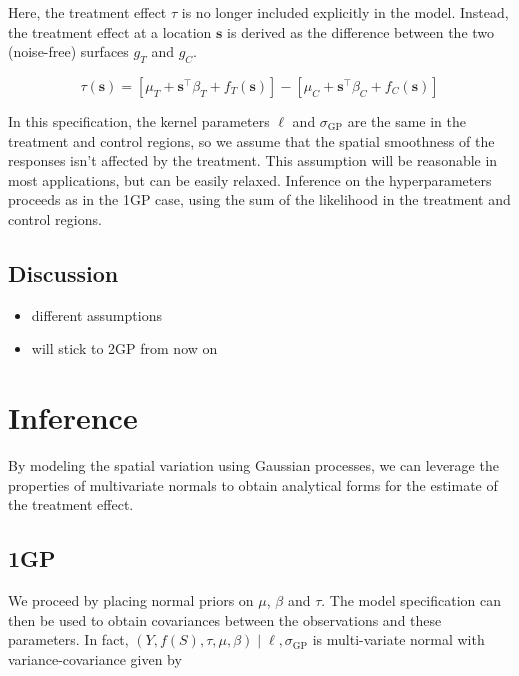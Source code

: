 \documentclass[letter]{article}
\providecommand{\tightlist}{%
      \setlength{\itemsep}{0pt}\setlength{\parskip}{0pt}}
\newcommand{\genericdel}[3]{%
      \left#1#3\right#2
    }
\newcommand{\del}[1]{\genericdel(){#1}}
\newcommand{\sbr}[1]{\genericdel[]{#1}}
\newcommand{\trans}{^{\intercal}}
\newcommand{\sigmaf}{\sigma_{\mathrm{GP}}}
\newcommand{\svec}{\mathbold{s}}
\providecommand{\tightlist}{%
  	  \setlength{\itemsep}{0pt}\setlength{\parskip}{0pt}}
\begin{document}
Here, the treatment effect \(\tau\) is no longer included explicitly in
the model. Instead, the treatment effect at a location \(\svec\) is
derived as the difference between the two (noise-free) surfaces \(g_T\)
and \(g_C\).

\begin{equation}
\tau(\svec) = \sbr{\mu_T + \svec\trans\beta_T + f_T(\svec)} - \sbr{\mu_C + \svec\trans\beta_C + f_C(\svec)}
\end{equation}

In this specification, the kernel parameters \(\ell\) and \(\sigmaf\)
are the same in the treatment and control regions, so we assume that the
spatial smoothness of the responses isn't affected by the treatment.
This assumption will be reasonable in most applications, but can be
easily relaxed. Inference on the hyperparameters proceeds as in the 1GP
case, using the sum of the likelihood in the treatment and control
regions.
    


    	\subsection{Discussion}\label{discussion}

\begin{itemize}
\tightlist
\item
  different assumptions
\item
  will stick to 2GP from now on
\end{itemize}
    


    	\section{Inference}\label{inference}

By modeling the spatial variation using Gaussian processes, we can
leverage the properties of multivariate normals to obtain analytical
forms for the estimate of the treatment effect.
    


    	\subsection{1GP}\label{gp}

We proceed by placing normal priors on \(\mu\), \(\beta\) and \(\tau\).
The model specification can then be used to obtain covariances between
the observations and these parameters. In fact,
\(\del{Y,f(S),\tau,\mu,\beta} \mid \ell,\sigmaf\) is multi-variate
normal with variance-covariance given by
\end{document}
